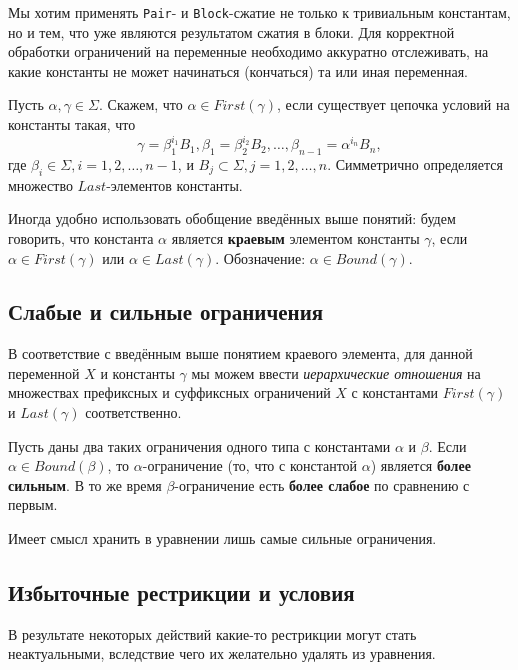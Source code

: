 \documentclass[12pt]{article}
\begin{document}
Мы хотим применять \texttt{Pair}- и \texttt{Block}-сжатие не только к
тривиальным константам, но и тем, что уже являются результатом сжатия в блоки.
Для корректной обработки ограничений на переменные необходимо аккуратно
отслеживать, на какие константы не может начинаться (кончаться) та или иная
переменная.

Пусть $\alpha, \gamma \in \Sigma$. Скажем, что $\alpha \in First(\gamma)$, если
существует цепочка условий на константы такая, что
\begin{displaymath}
  \gamma = \beta_1^{i_1} B_1,
  \beta_1 = \beta_2^{i_2} B_2,
  \dots,
  \beta_{n-1} = \alpha^{i_n} B_n,
\end{displaymath}
где $\beta_i \in \Sigma, i = 1, 2, \dots, n - 1$, и $B_j \subset \Sigma, j = 1,
2, \dots, n$. Симметрично определяется множество $Last$-элементов константы.

Иногда удобно использовать обобщение введённых выше понятий: будем
говорить, что константа $\alpha$ является \textbf{краевым} элементом константы
$\gamma$, если $\alpha \in First(\gamma)$ или $\alpha \in Last(\gamma)$.
Обозначение: $\alpha \in Bound(\gamma)$.

\subsection{Слабые и сильные ограничения}

В соответствие с введённым выше понятием краевого элемента, для данной
переменной $X$ и константы $\gamma$ мы можем ввести \textit{иерархические
отношения} на множествах префиксных и суффиксных ограничений $X$ с константами
$First(\gamma)$ и $Last(\gamma)$ соответственно.

Пусть даны два таких ограничения одного типа с константами $\alpha$ и $\beta$.
Если $\alpha \in Bound(\beta)$, то $\alpha$-ограничение (то, что с константой
$\alpha$) является \textbf{более сильным}. В то же время $\beta$-ограничение
есть \textbf{более слабое} по сравнению с первым.

Имеет смысл хранить в уравнении лишь самые сильные ограничения.

\subsection{Избыточные рестрикции и условия}

В результате некоторых действий какие-то рестрикции могут стать неактуальными,
вследствие чего их желательно удалять из уравнения.
\end{document}
